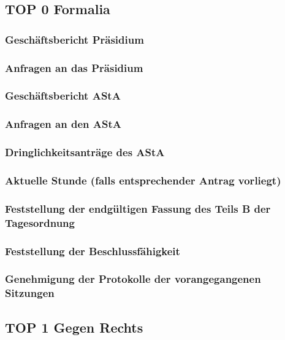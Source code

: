 \documentclass[ngerman,headheight=70pt]{scrartcl}
\begin{document}
    \subsection*{TOP 0 Formalia}

    \subsubsection{Geschäftsbericht Präsidium}

    \subsubsection{Anfragen an das Präsidium}

    \subsubsection{Geschäftsbericht AStA}

    \subsubsection{Anfragen an den AStA}

    \subsubsection{Dringlichkeitsanträge des AStA}

    \subsubsection{Aktuelle Stunde (falls entsprechender Antrag vorliegt)}

    \subsubsection{Feststellung der endgültigen Fassung des Teils B der Tagesordnung}

    \subsubsection{Feststellung der Beschlussfähigkeit}

    \subsubsection{Genehmigung der Protokolle der vorangegangenen Sitzungen}

    \subsection*{TOP 1 Gegen Rechts}
\end{document}
